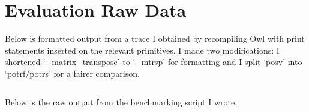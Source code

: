 \chapter{Evaluation Raw Data}\label{chap:eval_data}

Below is formatted output from a trace I obtained by recompiling Owl with print
statements inserted on the relevant primitives. I made two modifications: I
shortened `\_matrix\_transpose' to `\_mtrsp' for formatting and I split `posv'
into `potrf/potrs' for a fairer comparison.

\inputminted[fontsize=\small]{text}{trace.txt}

Below is the raw output from the benchmarking script I wrote.
\inputminted[fontsize=\small]{text}{timings.txt}

